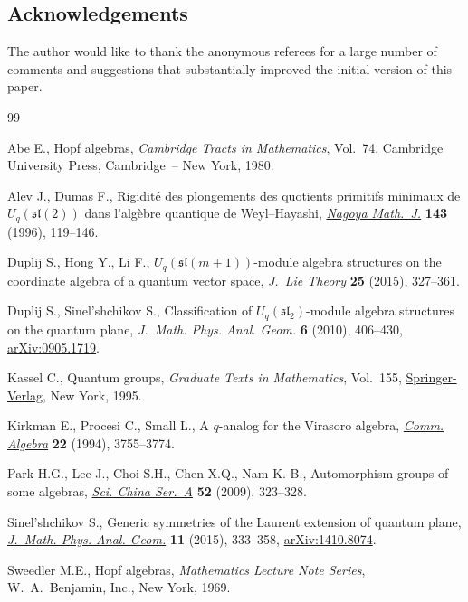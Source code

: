 \documentclass[pdftex]{sigma}
\numberwithin{equation}{section}
\begin{document}
\subsection*{Acknowledgements}

The author would like to thank the anonymous referees for a large number of comments and suggestions that substantially improved the initial version of this paper.

\begin{thebibliography}{99}
\footnotesize\itemsep=0pt

Abe E., Hopf algebras, \textit{Cambridge Tracts in Mathematics}, Vol.~74,
 Cambridge University Press, Cambridge~-- New York, 1980.

Alev J., Dumas F., Rigidit\'{e} des plongements des quotients primitifs
 minimaux de {$U_q(\mathfrak{sl}(2))$} dans l'alg\`ebre quantique de
 {W}eyl--{H}ayashi, \href{https://doi.org/10.1017/S002776300000595X}{\textit{Nagoya Math.~J.}} \textbf{143} (1996), 119--146.

Duplij S., Hong Y., Li F., {$U_q(\mathfrak{sl}(m+1))$}-module algebra
 structures on the coordinate algebra of a quantum vector space,
 \textit{J.~Lie Theory} \textbf{25} (2015), 327--361.

Duplij S., Sinel'shchikov S., Classification of {$U_q(\mathfrak{sl}_2)$}-module
 algebra structures on the quantum plane, \textit{J.~Math. Phys. Anal. Geom.}
 \textbf{6} (2010), 406--430, \href{http://arxiv.org/abs/0905.1719}{arXiv:0905.1719}.

Kassel C., Quantum groups, \textit{Graduate Texts in Mathematics}, Vol.~155,
 \href{https://doi.org/10.1007/978-1-4612-0783-2}{Springer-Verlag}, New York, 1995.

Kirkman E., Procesi C., Small L., A {$q$}-analog for the {V}irasoro algebra,
 \href{https://doi.org/10.1080/00927879408825052}{\textit{Comm. Algebra}} \textbf{22} (1994), 3755--3774.

Park H.G., Lee J., Choi S.H., Chen X.Q., Nam K.-B., Automorphism groups of some
 algebras, \href{https://doi.org/10.1007/s11425-009-0007-9}{\textit{Sci. China Ser.~A}} \textbf{52} (2009), 323--328.

Sinel'shchikov S., Generic symmetries of the {L}aurent extension of quantum
 plane, \href{https://doi.org/10.15407/mag11.04.333}{\textit{J.~Math. Phys. Anal. Geom.}} \textbf{11} (2015), 333--358,
 \href{http://arxiv.org/abs/1410.8074}{arXiv:1410.8074}.

Sweedler M.E., Hopf algebras, \textit{Mathematics Lecture Note Series}, W.~A.~Benjamin,
 Inc., New York, 1969.

\end{thebibliography}\LastPageEnding
\end{document}
